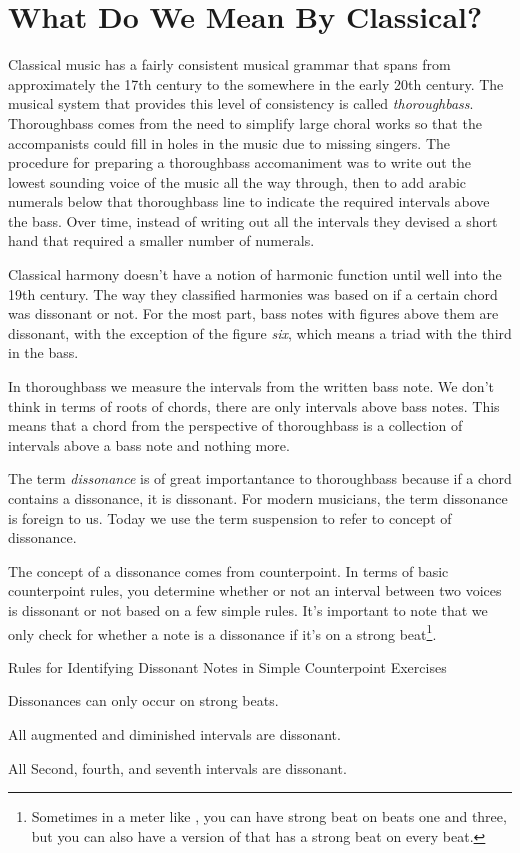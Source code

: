 \section{What Do We Mean By Classical?}

Classical music has a fairly consistent musical grammar that spans from approximately the 17th century to the somewhere in the early 20th century. The musical system that provides this level of consistency is called \emph{thoroughbass}. Thoroughbass comes from the need to simplify large choral works so that the accompanists could fill in holes in the music due to missing singers. The procedure for preparing a thoroughbass accomaniment was to write out the lowest sounding voice of the music all the way through, then to add arabic numerals below that thoroughbass line to indicate the required intervals above the bass. Over time, instead of writing out all the intervals they devised a short hand that required a smaller number of numerals.

Classical harmony doesn't have a notion of harmonic function until well into the 19th century. The way they classified harmonies was based on if a certain chord was dissonant or not. For the most part, bass notes with figures above them are dissonant, with the exception of the figure \emph{six}, which means a triad with the third in the bass.

In thoroughbass we measure the intervals from the written bass note. We don't think in terms of roots of chords, there are only intervals above bass notes. This means that a chord from the perspective of thoroughbass is a collection of intervals above a bass note and nothing more. 

The term \emph{dissonance} is of great importantance to thoroughbass because if a chord contains a dissonance, it is dissonant. For modern musicians, the term dissonance is foreign to us. Today we use the term suspension to refer to concept of dissonance.

The concept of a dissonance comes from counterpoint. In terms of basic counterpoint rules, you determine whether or not an interval between two voices is dissonant or not based on a few simple rules. It's important to note that we only check for whether a note is a dissonance if it's on a strong beat\footnote{Sometimes in a meter like , you can have strong beat on beats one and three, but you can also have a version of  that has a strong beat on every beat.}.

\begin{bookStyledList} {Rules for Identifying Dissonant Notes in Simple Counterpoint Exercises}
\item Dissonances can only occur on strong beats.
\item All augmented and diminished intervals are dissonant.
\item All Second, fourth, and seventh intervals are dissonant.
\end{bookStyledList}

